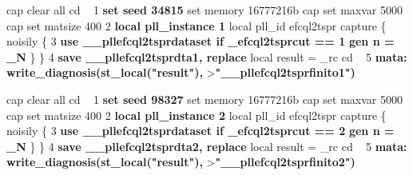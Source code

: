 \def\anchomini{.6\textwidth}
\begin{minipage}[c]{\anchomini}
\begin{semiverbatim}
  cap clear all
  cd ~
1 {\bf{}set seed 34815}
  set memory 16777216b
  cap set maxvar 5000
  cap set matsize 400
2 {\bf{}local pll\_instance 1}
  local pll_id efcql2tspr
  capture \{
  noisily \{
3 {\bf{}use \_\_pllefcql2tsprdataset if \_efcql2tsprcut == 1}
  {\bf{}gen n = \_N}
  \}
  \}
4 {\bf{}save \_\_pllefcql2tsprdta1, replace}
  local result = _rc
  cd ~
5 {\bf{}mata: write\_diagnosis(st\_local("result"),}
  >{\bf{}"\_\_pllefcql2tsprfinito1")}
\end{semiverbatim}
\end{minipage}\pause
\begin{minipage}[c]{\anchomini}
\begin{semiverbatim}
  cap clear all
  cd ~
1 {\bf{}set seed 98327}
  set memory 16777216b
  cap set maxvar 5000
  cap set matsize 400
2 {\bf{}local pll\_instance 2}
  local pll_id efcql2tspr
  capture \{
  noisily \{
3 {\bf{}use \_\_pllefcql2tsprdataset if \_efcql2tsprcut == 2}
  {\bf{}gen n = \_N}
  \}
  \}
4 {\bf{}save \_\_pllefcql2tsprdta2, replace}
  local result = _rc
  cd ~
5 {\bf{}mata: write\_diagnosis(st\_local("result"),}
  >{\bf{}"\_\_pllefcql2tsprfinito2")}
\end{semiverbatim}
\end{minipage}
